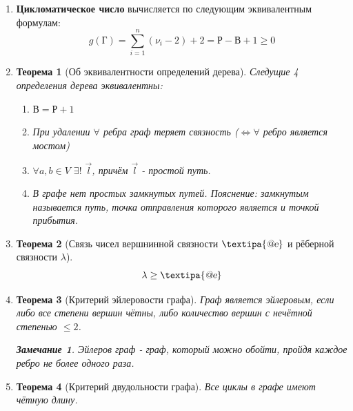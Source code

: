 \documentclass[a4paper,12pt]{article}
\newtheorem{theorem}{Теорема}
\newtheorem{notice}{Замечание}
\begin{document}
\begin{enumerate}
            \item \textbf{Цикломатическое число} вычисляется по следующим эквивалентным формулам: 
            $$
                g(Г) = \sum_{i=1}^n \left(\nu_i - 2\right) + 2 = Р - В + 1 \geq 0
            $$
            \item \begin{theorem}[Об эквивалентности определений дерева]
            Следущие 4 определения дерева эквивалентны:
                     \begin{enumerate}
                         \item $В = Р + 1$
                         \item При удалении $\forall$ ребра граф теряет связность ($\Leftrightarrow \forall$ ребро является мостом)
                         \item $\forall a, b \in V$ $\exists ! $ $\Vec{l}$, причём $\Vec{l}$ - простой путь.
                         \item В графе нет простых замкнутых путей.
                         \textit{Пояснение:} \textit{замкнутым} называется путь, точка отправления которого является и точкой прибытия.
                     \end{enumerate}
                \end{theorem}
            \item 
                \begin{theorem}[Связь чисел вершнинной связности $\textipa{\textsl{@e}}$ и рёберной связности $\lambda$]
                    $$
                    \lambda \geq \textipa{\textsl{@e}}
                    $$
                \end{theorem}
            \item 
                \begin{theorem}[Критерий эйлеровости графа]
                    Граф является эйлеровым, если либо все степени вершин чётны, либо количество вершин с нечётной степенью $\leq 2$. 
                    \begin{notice}
                        Эйлеров граф - граф, который можно обойти, пройдя каждое ребро не более одного раза.
                    \end{notice}
                \end{theorem}
            \item 
                \begin{theorem}[Критерий двудольности графа]
                    Все циклы в графе имеют чётную длину. 
                \end{theorem}

\end{enumerate}
\end{document}
